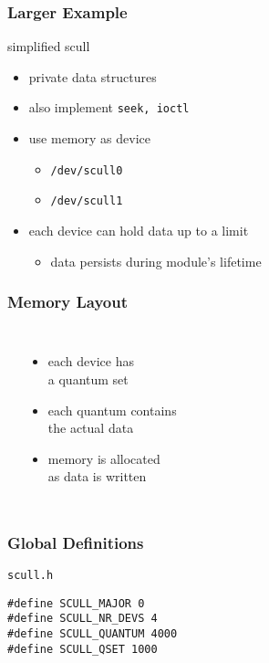\documentclass[dvipsnames]{beamer}
\begin{document}
\begin{frame}
  \frametitle{Larger Example}

  \begin{exampleblock}{simplified scull}
    \begin{itemize}
      \item private data structures
      \item also implement \lstinline|seek, ioctl|

      \pause
      \medskip
      \item use memory as device
      \begin{itemize}
        \item \texttt{/dev/scull0}
        \item \texttt{/dev/scull1}
      \end{itemize}

      \item each device can hold data up to a limit
      \begin{itemize}
        \item data persists during module's lifetime
      \end{itemize}
    \end{itemize}
  \end{exampleblock}
\end{frame}

\begin{frame}
  \frametitle{Memory Layout}

  \begin{columns}
    \begin{center}
    \end{center}

    \pause
    \begin{itemize}
      \item each device has\\
        a quantum set
      \item each quantum contains\\
        the actual data
      \item memory is allocated\\
        as data is written
    \end{itemize}
  \end{columns}
\end{frame}

\begin{frame}[fragile]
  \frametitle{Global Definitions}

  \begin{exampleblock}{\texttt{scull.h}}
    \begin{lstlisting}
#define SCULL_MAJOR 0
#define SCULL_NR_DEVS 4
#define SCULL_QUANTUM 4000
#define SCULL_QSET 1000
    \end{lstlisting}
  \end{exampleblock}
\end{frame}
\end{document}
